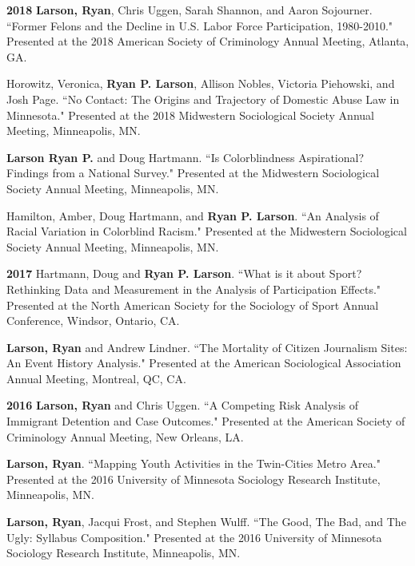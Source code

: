 \documentclass[letterpaper]{article}
\newenvironment{publist}{%
  \begin{list}{}{%
    \setlength{\leftmargin}{0cm}   %
    \setlength{\labelwidth}{2cm}     %
    \setlength{\labelsep}{0.5cm}     %
  }%
}{%
  \end{list}%
}
\begin{document}
\begin{publist}
\item[\textbf{2018}] \textbf{Larson, Ryan}, Chris Uggen, Sarah Shannon, and Aaron Sojourner. ``Former Felons and the Decline in U.S. Labor Force Participation, 1980-2010." Presented at the 2018 American Society of Criminology Annual Meeting, Atlanta, GA. 
\item Horowitz, Veronica, \textbf{Ryan P. Larson}, Allison Nobles, Victoria Piehowski, and Josh Page. ``No Contact: The Origins and Trajectory of Domestic Abuse Law in Minnesota." Presented at the 2018 Midwestern Sociological Society Annual Meeting, Minneapolis, MN. 

\item \textbf{Larson Ryan P.} and Doug Hartmann. ``Is Colorblindness Aspirational? Findings from a National Survey." Presented at the Midwestern Sociological Society Annual Meeting, Minneapolis, MN. 

\item Hamilton, Amber, Doug Hartmann, and \textbf{Ryan P. Larson}. ``An Analysis of Racial Variation in Colorblind Racism." Presented at the Midwestern Sociological Society Annual Meeting, Minneapolis, MN. 

\item[\textbf{2017}] Hartmann, Doug and \textbf{Ryan P. Larson}. ``What is it about Sport? Rethinking Data and Measurement in the Analysis of Participation Effects."  Presented at the North American Society for the Sociology of Sport Annual Conference, Windsor, Ontario, CA. 

\item \textbf{Larson, Ryan} and Andrew Lindner. ``The Mortality of Citizen Journalism Sites: An Event History Analysis." Presented at the American Sociological Association Annual Meeting, Montreal, QC, CA.

\item[\textbf{2016}] \textbf{Larson, Ryan} and Chris Uggen. ``A Competing Risk Analysis of Immigrant Detention and Case Outcomes." Presented at the American Society of Criminology Annual Meeting, New Orleans, LA. 

\item \textbf{Larson, Ryan}. ``Mapping Youth Activities in the Twin-Cities Metro Area." Presented at the 2016 University of Minnesota Sociology Research Institute, Minneapolis, MN. 

\item \textbf{Larson, Ryan}, Jacqui Frost, and Stephen Wulff. ``The Good, The Bad, and The Ugly: Syllabus Composition." Presented at the 2016 University of Minnesota Sociology Research Institute, Minneapolis, MN. 


\end{publist}
\end{document}
